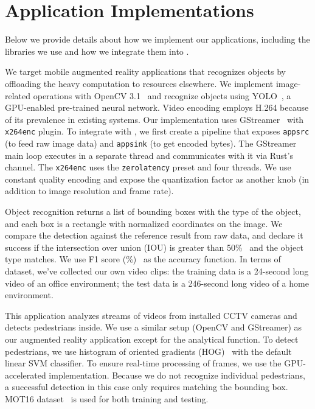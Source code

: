 \section{Application Implementations}
\label{appendix:appl-impl}

Below we provide details about how we implement our applications, including the
libraries we use and how we integrate them into \sysname{}.

 We target mobile augmented reality applications that
recognizes objects by offloading the heavy computation to resources elsewhere.
We implement image-related operations with OpenCV 3.1~\cite{opencvlibrary} and
recognize objects using YOLO~\cite{darknet13, redmon2016yolo9000}, a GPU-enabled
pre-trained neural network. Video encoding employs H.264 because of its
prevalence in existing systems. Our implementation uses
GStreamer~\cite{gstreamer} with \texttt{x264enc} plugin. To integrate with
\sysname{}, we first create a pipeline that exposes \texttt{appsrc} (to feed raw
image data) and \texttt{appsink} (to get encoded bytes). The GStreamer main loop
executes in a separate thread and \sysname{} communicates with it via Rust's
channel. The \texttt{x264enc} uses the \texttt{zerolatency} preset and four
threads. We use constant quality encoding and expose the quantization factor as
another knob (in addition to image resolution and frame rate).

Object recognition returns a list of bounding boxes with the type of the object,
and each box is a rectangle with normalized coordinates on the image. We compare
the detection against the reference result from raw data, and declare it success
if the intersection over union (IOU) is greater than
50\%~\cite{everingham2010pascal} and the object type matches. We use F1 score
(\%)~\cite{Rijsbergen:1979:IR:539927} as the accuracy function. In terms of
dataset, we've collected our own video clips: the training data is a 24-second
long video of an office environment; the test data is a 246-second long video of
a home environment.

 This application analyzes streams of videos from
installed CCTV cameras and detects pedestrians inside. We use a similar setup
(OpenCV and GStreamer) as our augmented reality application except for the
analytical function. To detect pedestrians, we use histogram of oriented
gradients (HOG)~\cite{dalal2005histograms} with the default linear SVM
classifier. To ensure real-time processing of frames, we use the GPU-accelerated
implementation. Because we do not recognize individual pedestrians, a successful
detection in this case only requires matching the bounding box.  MOT16
dataset~\cite{milan2016mot16} is used for both training and testing.

